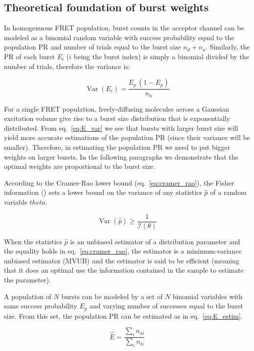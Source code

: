 \subsection{Theoretical foundation of burst weights}
\label{sec:burstweights_theory}
In homogenuous FRET population, burst counts in the acceptor channel can be
modeled as a binomial random variable with success probability equal to the
population PR and number of trials equal to the burst size $n_d + n_a$.
Similarly, the PR of each burst $E_i$ ($i$ being the burst index) is simply a binomial divided by the 
number of trials, therefore the variance is:

\begin{equation}
\label{eq:E_var}
\operatorname{Var} (E_i) = \frac{E_p\,(1 - E_p)}{n_{ti}}
\end{equation}

For a single FRET population, freely-diffusing molecules across 
a Gaussian excitation volume give rise to 
a burst size distribution that is exponentially distributed.
From eq.~\ref{eq:E_var} we see that bursts with larger burst size
will yield more accurate estimations of the population PR
(since their variance will be smaller). Therefore, in estimating the 
population PR we need to put bigger weights on larger bursts.
In the following paragraphs we demonstrate that the optimal weights
are proportional to the burst size.

According to the Cramer-Rao lower bound (eq.~\ref{eq:cramer_rao}), the 
Fisher information (\theta) sets a lower bound on the
variance of any statistics $\hat{p}$ of a random variable $theta$.

\begin{equation}
\label{eq:cramer_rao}
\operatorname{Var}\left(\hat{p}\right) \ge \frac{1}{\mathcal{I}(\theta)}
\end{equation}

When the statistics $\hat{p}$ is an unbiased estimator of a distribution 
parameter and the equality holds in eq.~\ref{eq:cramer_rao},
the estimator is a minimum-variance unbiased estimator (MVUB)
and the estimator is said to be efficient (meaning that it does an
optimal use the information contained in the sample to estimate the
parameter).

A population of $N$ bursts can be modeled by a set of $N$ binomial
variables with same success probability $E_p$ and varying number of successes
equal to the burst size. From this set, the population PR can be estimated
as in eq.~\ref{eq:E_estim}.

\begin{equation}
\label{eq:E_estim}
\hat{E} = \frac{\sum_i n_{ai}}{\sum_i n_{ti}}
\end{equation}

